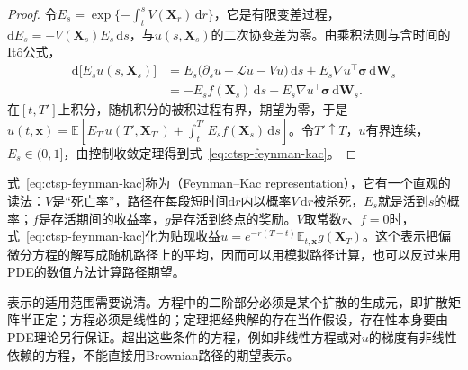 \begin{proof}
令$E_s=\exp\{-\int_t^sV(\bm X_r)\,\mathrm dr\}$，它是有限变差过程，$\mathrm dE_s=-V(\bm X_s)E_s\,\mathrm ds$，与$u(s,\bm X_s)$的二次协变差为零。由乘积法则与含时间的Itô公式，
\[
  \begin{aligned}
    \mathrm d\bigl[E_su(s,\bm X_s)\bigr]&=E_s\bigl(\partial_su+\mathcal Lu-Vu\bigr)\,\mathrm ds+E_s\nabla u^\top\bm\sigma\,\mathrm d\bm W_s\\
    &=-E_sf(\bm X_s)\,\mathrm ds+E_s\nabla u^\top\bm\sigma\,\mathrm d\bm W_s .
  \end{aligned}
\]
在$[t,T']$上积分，随机积分的被积过程有界，期望为零，于是$u(t,\bm x)=\mathbb E[E_{T'}u(T',\bm X_{T'})+\int_t^{T'}E_sf(\bm X_s)\,\mathrm ds]$。令$T'\uparrow T$，$u$有界连续，$E_s\in(0,1]$，由控制收敛定理得到式~\eqref{eq:ctsp-feynman-kac}。
\end{proof}

式~\eqref{eq:ctsp-feynman-kac}称为（Feynman--Kac representation），它有一个直观的读法：$V$是“死亡率”，路径在每段短时间$\mathrm dr$内以概率$V\,\mathrm dr$被杀死，$E_s$就是活到$s$的概率；$f$是存活期间的收益率，$g$是存活到终点的奖励。$V$取常数$r$、$f=0$时，式~\eqref{eq:ctsp-feynman-kac}化为贴现收益$u=e^{-r(T-t)}\mathbb E_{t,\bm x}g(\bm X_T)$。这个表示把偏微分方程的解写成随机路径上的平均，因而可以用模拟路径计算，也可以反过来用PDE的数值方法计算路径期望。

表示的适用范围需要说清。方程中的二阶部分必须是某个扩散的生成元，即扩散矩阵半正定；方程必须是线性的；定理把经典解的存在当作假设，存在性本身要由PDE理论另行保证。超出这些条件的方程，例如非线性方程或对$u$的梯度有非线性依赖的方程，不能直接用Brownian路径的期望表示。
